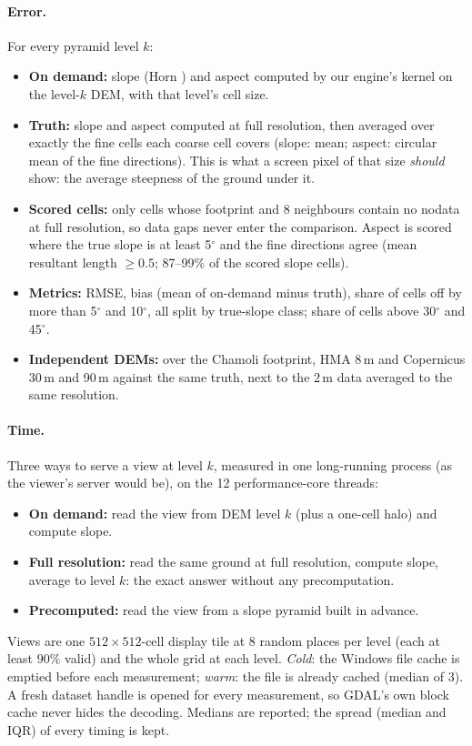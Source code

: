 ﻿\documentclass[11pt,a4paper]{article}
\begin{document}
\paragraph{Error.} For every pyramid level $k$:
\begin{itemize}
  \item \textbf{On demand:} slope (Horn \cite{horn}) and aspect computed by our engine's kernel on the level-$k$ DEM,
  with that level's cell size.
  \item \textbf{Truth:} slope and aspect computed at full resolution, then averaged over exactly the fine cells each
  coarse cell covers (slope: mean; aspect: circular mean of the fine directions). This is what a screen pixel of that
  size \emph{should} show: the average steepness of the ground under it.
  \item \textbf{Scored cells:} only cells whose footprint and 8 neighbours contain no nodata at full resolution, so
  data gaps never enter the comparison. Aspect is scored where the true slope is at least 5$^\circ$ and the fine
  directions agree (mean resultant length $\geq0.5$; 87--99\% of the scored slope cells).
  \item \textbf{Metrics:} RMSE, bias (mean of on-demand minus truth), share of cells off by more than 5$^\circ$ and
  10$^\circ$, all split by true-slope class; share of cells above 30$^\circ$ and 45$^\circ$.
  \item \textbf{Independent DEMs:} over the Chamoli footprint, HMA 8\,m and Copernicus 30\,m and 90\,m \cite{cop30}
  against the same truth, next to the 2\,m data averaged to the same resolution.
\end{itemize}

\paragraph{Time.} Three ways to serve a view at level $k$, measured in one long-running process (as the viewer's
server would be), on the 12 performance-core threads:
\begin{itemize}
  \item \textbf{On demand:} read the view from DEM level $k$ (plus a one-cell halo) and compute slope.
  \item \textbf{Full resolution:} read the same ground at full resolution, compute slope, average to level $k$: the
  exact answer without any precomputation.
  \item \textbf{Precomputed:} read the view from a slope pyramid built in advance.
\end{itemize}
Views are one $512\times512$-cell display tile at 8 random places per level (each at least 90\% valid) and the whole
grid at each level. \emph{Cold}: the Windows file cache is emptied before each measurement; \emph{warm}: the file is
already cached (median of 3). A fresh dataset handle is opened for every measurement, so GDAL's own block cache
never hides the decoding. Medians are reported; the spread (median and IQR) of every timing is kept.
\end{document}
